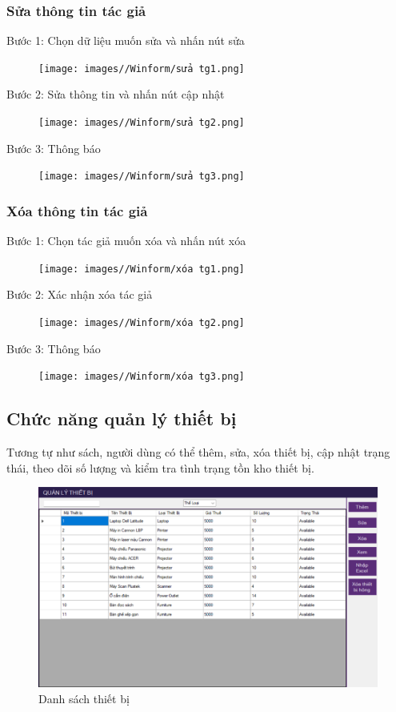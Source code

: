 \documentclass{article}
\begin{document}
\subsubsection{Sửa thông tin tác giả}
Bước 1: Chọn dữ liệu muốn sửa và nhấn nút sửa
\begin{figure} [H]
    \centering
    \texttt{[image: images//Winform/sửa tg1.png]}
    \label{fig:enter-label}
\end{figure}

Bước 2: Sửa thông tin và nhấn nút cập nhật
\begin{figure} [H]
    \centering
    \texttt{[image: images//Winform/sửa tg2.png]}
    \label{fig:enter-label}
\end{figure}

Bước 3: Thông báo
\begin{figure} [H]
    \centering
    \texttt{[image: images//Winform/sửa tg3.png]}
    \label{fig:enter-label}
\end{figure}

\newpage
\subsubsection{Xóa thông tin tác giả}
Bước 1: Chọn tác giả muốn xóa và nhấn nút xóa
\begin{figure} [H]
    \centering
    \texttt{[image: images//Winform/xóa tg1.png]}
    \label{fig:enter-label}
\end{figure}

Bước 2: Xác nhận xóa tác giả
\begin{figure} [H]
    \centering
    \texttt{[image: images//Winform/xóa tg2.png]}
    \label{fig:enter-label}
\end{figure}

Bước 3: Thông báo
\begin{figure} [H]
    \centering
    \texttt{[image: images//Winform/xóa tg3.png]}
    \label{fig:enter-label}
\end{figure}

\newpage
\subsection{Chức năng quản lý thiết bị}
Tương tự như sách, người dùng có thể thêm, sửa, xóa thiết bị, cập nhật trạng thái, theo dõi số lượng và kiểm tra tình trạng tồn kho thiết bị.

\begin{figure} [H]
    \centering
    \includegraphics[width=0.8\linewidth]{images//Winform/cn ql tb1.png}
    \caption{Danh sách thiết bị}
    \label{fig:enter-label}
\end{figure}
\end{document}
